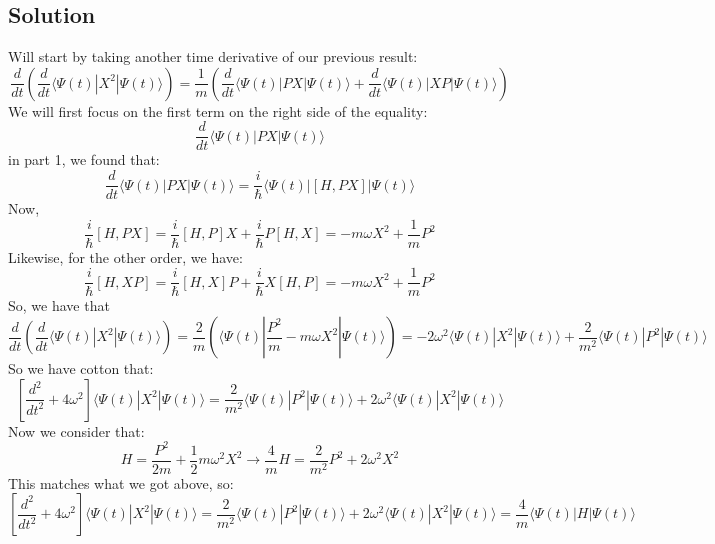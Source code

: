 \documentclass[12pt]{article}
\begin{document}
\subsection{Solution}
Will start by taking another time derivative of our previous result:
\begin{equation}
    \frac{d}{dt} \left(\frac{d}{dt} \langle \Psi(t)|X^2|\Psi(t)\rangle\right) = \frac{1}{m} \left(\frac{d}{dt}\langle \Psi(t)|PX|\Psi(t)\rangle+ \frac{d}{dt}\langle \Psi(t)|XP|\Psi(t)\rangle\right)
\end{equation}
We will first focus on the first term on the right side of the equality:
\begin{equation}
    \frac{d}{dt}\langle \Psi(t)|PX|\Psi(t)\rangle 
\end{equation}
in part 1, we found that:
\begin{equation}
    \frac{d}{dt}\langle \Psi(t)|PX|\Psi(t)\rangle = \frac{i}{\hbar}\langle \Psi(t)|[H, PX]|\Psi(t)\rangle
\end{equation}
Now,
\begin{equation}
   \frac{i}{\hbar} [H, PX] = \frac{i}{\hbar} [H, P]X + \frac{i}{\hbar} P[H, X] = -m\omega X^{2} +\frac{1}{m}P^{2}
\end{equation}
Likewise, for the other order, we have:
\begin{equation}
    \frac{i}{\hbar} [H, XP] = \frac{i}{\hbar} [H, X]P + \frac{i}{\hbar} X[H, P] = -m\omega X^{2} +\frac{1}{m}P^{2}
\end{equation}
So, we have that 
\begin{equation}
    \frac{d}{dt}\left(\frac{d}{dt} \langle \Psi(t)|X^2|\Psi(t)\rangle\right) = \frac{2}{m} \left(\langle\Psi (t)|\frac{P^{2}}{m}-m\omega X^{2}|\Psi (t)\rangle\right)= -2\omega ^{2} \langle\Psi (t)|X^{2}|\Psi (t)\rangle + \frac{2}{m^{2}} \langle\Psi (t)|P^{2}|\Psi (t)\rangle
\end{equation}
So we have cotton that:
\begin{equation}
    \left[ \frac{d^2}{dt^2} + 4\omega^2 \right]\langle \Psi(t)|X^2|\Psi(t)\rangle = \frac{2}{m^{2}} \langle\Psi (t)|P^{2}|\Psi (t)\rangle + 2\omega ^{2} \langle\Psi (t)|X^{2}|\Psi (t)\rangle
\end{equation}
Now we consider that:
\begin{equation}
    H = \frac{P^{2}}{2m} + \frac{1}{2}m\omega ^{2}X^{2} 
\rightarrow \frac{4}{m}H = \frac{2}{m^{2}}P^{2} + 2\omega ^{2}X^{2}
\end{equation}
This matches what we got above, so:
\begin{equation}
    \boxed{\left[ \frac{d^2}{dt^2} + 4\omega^2 \right]\langle \Psi(t)|X^2|\Psi(t)\rangle = \frac{2}{m^{2}} \langle\Psi (t)|P^{2}|\Psi (t)\rangle + 2\omega ^{2} \langle\Psi (t)|X^{2}|\Psi (t)\rangle = \frac{4}{m} \langle \Psi(t)|H|\Psi(t)\rangle}
    \end{equation}
\end{document}
